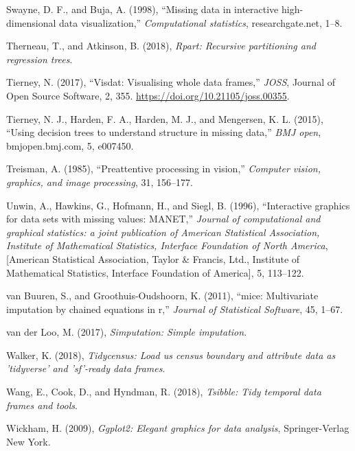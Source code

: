 \documentclass[]{article}
\theoremstyle{definition}
\theoremstyle{definition}
\theoremstyle{definition}
\theoremstyle{remark}
\begin{document}
\leavevmode\hypertarget{ref-Swayne1998}{}%
Swayne, D. F., and Buja, A. (1998), ``Missing data in interactive
high-dimensional data visualization,'' \emph{Computational statistics},
researchgate.net, 1--8.

\leavevmode\hypertarget{ref-rpart}{}%
Therneau, T., and Atkinson, B. (2018), \emph{Rpart: Recursive
partitioning and regression trees}.

\leavevmode\hypertarget{ref-visdat}{}%
Tierney, N. (2017), ``Visdat: Visualising whole data frames,''
\emph{JOSS}, Journal of Open Source Software, 2, 355.
\url{https://doi.org/10.21105/joss.00355}.

\leavevmode\hypertarget{ref-Tierney2015}{}%
Tierney, N. J., Harden, F. A., Harden, M. J., and Mengersen, K. L.
(2015), ``Using decision trees to understand structure in missing
data,'' \emph{BMJ open}, bmjopen.bmj.com, 5, e007450.

\leavevmode\hypertarget{ref-treisman1985}{}%
Treisman, A. (1985), ``Preattentive processing in vision,''
\emph{Computer vision, graphics, and image processing}, 31, 156--177.

\leavevmode\hypertarget{ref-Unwin1996}{}%
Unwin, A., Hawkins, G., Hofmann, H., and Siegl, B. (1996), ``Interactive
graphics for data sets with missing values: MANET,'' \emph{Journal of
computational and graphical statistics: a joint publication of American
Statistical Association, Institute of Mathematical Statistics, Interface
Foundation of North America}, {[}American Statistical Association,
Taylor \& Francis, Ltd., Institute of Mathematical Statistics, Interface
Foundation of America{]}, 5, 113--122.

\leavevmode\hypertarget{ref-mice}{}%
van Buuren, S., and Groothuis-Oudshoorn, K. (2011), ``mice: Multivariate
imputation by chained equations in r,'' \emph{Journal of Statistical
Software}, 45, 1--67.

\leavevmode\hypertarget{ref-simputation}{}%
van der Loo, M. (2017), \emph{Simputation: Simple imputation}.

\leavevmode\hypertarget{ref-tidycensus}{}%
Walker, K. (2018), \emph{Tidycensus: Load us census boundary and
attribute data as 'tidyverse' and 'sf'-ready data frames}.

\leavevmode\hypertarget{ref-tsibble}{}%
Wang, E., Cook, D., and Hyndman, R. (2018), \emph{Tsibble: Tidy temporal
data frames and tools}.

\leavevmode\hypertarget{ref-ggplot2}{}%
Wickham, H. (2009), \emph{Ggplot2: Elegant graphics for data analysis},
Springer-Verlag New York.
\end{document}
